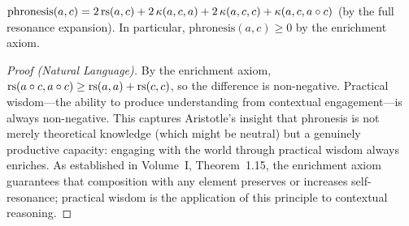 \begin{theorem}
\label{thm:phronesis-emergence}
$\mathrm{phronesis}(a, c) = 2\,\mathrm{rs}(a, c) + 2\,\kappa(a, c, a) + 2\,\kappa(a, c, c)
+ \kappa(a, c, a \circ c)$ (by the full resonance expansion).
In particular, $\mathrm{phronesis}(a, c) \geq 0$ by the enrichment axiom.
\end{theorem}

\begin{proof}[Proof (Natural Language)]
By the enrichment axiom, $\mathrm{rs}(a \circ c, a \circ c) \geq \mathrm{rs}(a, a) + \mathrm{rs}(c, c)$,
so the difference is non-negative. Practical wisdom---the ability to produce
understanding from contextual engagement---is always non-negative. This captures
Aristotle's insight that phronesis is not merely theoretical knowledge (which might
be neutral) but a genuinely productive capacity: engaging with the world through
practical wisdom always enriches. As established in Volume~I, Theorem~1.15, the
enrichment axiom guarantees that composition with any element preserves or increases
self-resonance; practical wisdom is the application of this principle to contextual
reasoning.
\end{proof}

